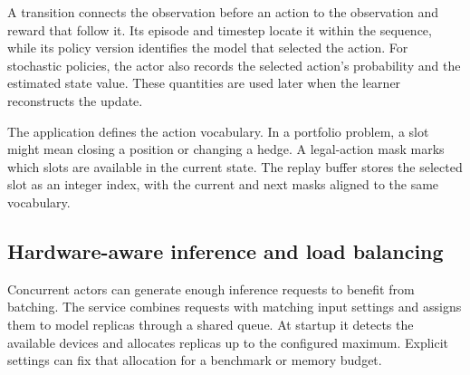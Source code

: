 \documentclass{strategynet-journal}
\begin{document}
A transition connects the observation before an action to the observation
and reward that follow it. Its episode and timestep locate it within the
sequence, while its policy version identifies the model that selected the
action. For stochastic policies, the actor also records the selected action's
probability and the estimated state value. These quantities are used later
when the learner reconstructs the update.

The application defines the action vocabulary. In a portfolio problem, a
slot might mean closing a position or changing a hedge. A legal-action mask
marks which slots are available in the current state. The replay buffer stores
the selected slot as an integer index, with the current and next masks aligned
to the same vocabulary.

\subsection{Hardware-aware inference and load balancing}

Concurrent actors can generate enough inference requests to benefit from
batching. The service combines requests with matching input settings and
assigns them to model replicas through a shared queue. At startup it detects
the available devices and allocates replicas up to the configured maximum.
Explicit settings can fix that allocation for a benchmark or memory budget.
\end{document}
